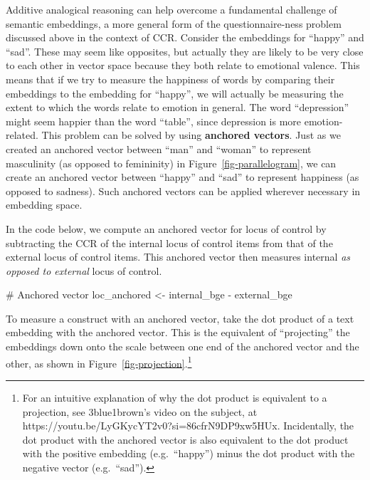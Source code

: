 \documentclass[
  man,
  floatsintext,
  longtable,
  nolmodern,
  notxfonts,
  notimes,
  colorlinks=true,linkcolor=blue,citecolor=blue,urlcolor=blue]{apa7}
\newenvironment{Shaded}{\begin{snugshade}}{\end{snugshade}}
\newcommand{\CommentTok}[1]{\textcolor[rgb]{0.37,0.37,0.37}{#1}}
\newcommand{\NormalTok}[1]{\textcolor[rgb]{0.00,0.23,0.31}{#1}}
\newcommand{\OtherTok}[1]{\textcolor[rgb]{0.00,0.23,0.31}{#1}}
\newcommand{\SpecialCharTok}[1]{\textcolor[rgb]{0.37,0.37,0.37}{#1}}
\begin{document}
Additive analogical reasoning can help overcome a fundamental challenge
of semantic embeddings, a more general form of the questionnaire-ness
problem discussed above in the context of CCR. Consider the embeddings
for ``happy'' and ``sad''. These may seem like opposites, but actually
they are likely to be very close to each other in vector space because
they both relate to emotional valence. This means that if we try to
measure the happiness of words by comparing their embeddings to the
embedding for ``happy'', we will actually be measuring the extent to
which the words relate to emotion in general. The word ``depression''
might seem happier than the word ``table'', since depression is more
emotion-related. This problem can be solved by using \textbf{anchored
vectors}. Just as we created an anchored vector between ``man'' and
``woman'' to represent masculinity (as opposed to femininity) in
Figure~\ref{fig-parallelogram}, we can create an anchored vector between
``happy'' and ``sad'' to represent happiness (as opposed to sadness).
Such anchored vectors can be applied wherever necessary in embedding
space.

In the code below, we compute an anchored vector for locus of control by
subtracting the CCR of the internal locus of control items from that of
the external locus of control items. This anchored vector then measures
internal \emph{as opposed to external} locus of control.

\begin{Shaded}
\begin{Highlighting}[]
\CommentTok{\# Anchored vector}
\NormalTok{loc\_anchored }\OtherTok{\textless{}{-}}\NormalTok{ internal\_bge }\SpecialCharTok{{-}}\NormalTok{ external\_bge}
\end{Highlighting}
\end{Shaded}

To measure a construct with an anchored vector, take the dot product of
a text embedding with the anchored vector. This is the equivalent of
``projecting'' the embeddings down onto the scale between one end of the
anchored vector and the other, as shown in
Figure~\ref{fig-projection}.\footnote{For an intuitive explanation of
  why the dot product is equivalent to a projection, see 3blue1brown's
  video on the subject, at
  https://youtu.be/LyGKycYT2v0?si=86cfrN9DP9xw5HUx. Incidentally, the
  dot product with the anchored vector is also equivalent to the dot
  product with the positive embedding (e.g.~``happy'') minus the dot
  product with the negative vector (e.g.~``sad'').}
\end{document}

